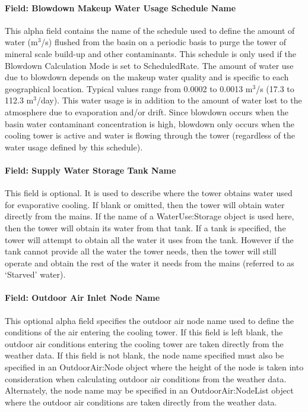 \paragraph{Field: Blowdown Makeup Water Usage Schedule Name}\label{field-blowdown-makeup-water-usage-schedule-name-2}

This alpha field contains the name of the schedule used to define the amount of water (m\(^{3}\)/s) flushed from the basin on a periodic basis to purge the tower of mineral scale build-up and other contaminants. This schedule is only used if the Blowdown Calculation Mode is set to ScheduledRate. The amount of water use due to blowdown depends on the makeup water quality and is specific to each geographical location. Typical values range from 0.0002 to 0.0013 m\(^{3}\)/s (17.3 to 112.3 m\(^{3}\)/day). This water usage is in addition to the amount of water lost to the atmosphere due to evaporation and/or drift. Since blowdown occurs when the basin water contaminant concentration is high, blowdown only occurs when the cooling tower is active and water is flowing through the tower (regardless of the water usage defined by this schedule).

\paragraph{Field: Supply Water Storage Tank Name}\label{field-supply-water-storage-tank-name-2}

This field is optional. It is used to describe where the tower obtains water used for evaporative cooling. If blank or omitted, then the tower will obtain water directly from the mains. If the name of a WaterUse:Storage object is used here, then the tower will obtain its water from that tank. If a tank is specified, the tower will attempt to obtain all the water it uses from the tank. However if the tank cannot provide all the water the tower needs, then the tower will still operate and obtain the rest of the water it needs from the mains (referred to as `Starved' water).

\paragraph{Field: Outdoor Air Inlet Node Name}\label{field-outdoor-air-inlet-node-name-2}

This optional alpha field specifies the outdoor air node name used to define the conditions of the air entering the cooling tower. If this field is left blank, the outdoor air conditions entering the cooling tower are taken directly from the weather data. If this field is not blank, the node name specified must also be specified in an OutdoorAir:Node object where the height of the node is taken into consideration when calculating outdoor air conditions from the weather data. Alternately, the node name may be specified in an OutdoorAir:NodeList object where the outdoor air conditions are taken directly from the weather data.

